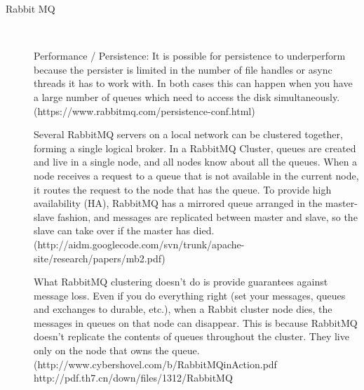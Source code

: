 \begin{description}
    \item [Rabbit MQ] \hfill \\
    {
    Performance / Persistence:
    It is possible for persistence to underperform because the persister is
    limited in the number of file handles or async threads it has to work with.
    In both cases this can happen when you have a large number of queues which
    need to access the disk simultaneously. 
    (https://www.rabbitmq.com/persistence-conf.html)

    Several RabbitMQ servers on a local network can be clustered together,
    forming a single logical broker.   In a RabbitMQ Cluster, queues are
    created and live in a single node, and all nodes know about
    all the queues. When a node receives a request to a queue
    that is not available in the current node, it routes the request
    to the node that has the queue.
    To provide high availability
    (HA), RabbitMQ has a mirrored queue arranged in the
    master-slave fashion, and messages are replicated between
    master and slave, so the slave can take over if the master
    has died.
    (http://aidm.googlecode.com/svn/trunk/apache-site/research/papers/mb2.pdf)

    What RabbitMQ clustering doesn't do is provide guarantees against message loss.
    Even if you do everything right (set your messages, queues and exchanges to
    durable, etc.), when a Rabbit cluster node dies, the messages in queues on that
    node can disappear. This is because RabbitMQ doesn't replicate the contents
    of queues throughout the cluster. They live only on the node that owns the
    queue.
    (http://www.cybershovel.com/b/RabbitMQinAction.pdf
    http://pdf.th7.cn/down/files/1312/RabbitMQ%
    
}
\end{description}

